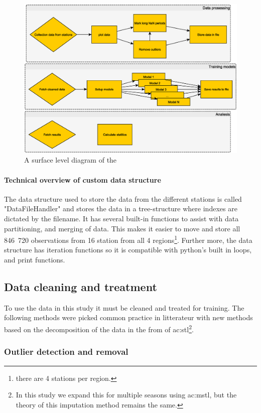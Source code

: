 \begin{figure}
	\centering
	\includegraphics[width=0.7\linewidth]{figures/progress_diagram}
	\caption[Diagram sketching three procedures used in this study.]{A surface level diagram of the }
	\label{fig:progressdiagram}
\end{figure}


\paragraph[Data structure]{Technical overview of custom data structure}
The data structure used to store the data from the different stations is called "DataFileHandler" and stores the data in a tree-structure where indexes are dictated by the filename. It has several built-in functions to assist with data partitioning, and merging of data. This makes it easier to move and store all 846 720 observations from 16 station from all 4 regions\footnote{there are 4 stations per region.}. Further more, the data structure has iteration functions so it is compatible with python's built in loops, and print functions. 

\subsection{Data cleaning and treatment}

To use the data in this study it must be cleaned and treated for training. The following methods were picked common practice in litterateur with new methods based on the decomposition of the data in the from of \acrfull{ac:stl}\cite{cleveland_stl_1990}\footnote{In this study we expand this for multiple seasons using \acrfull{ac:mstl}\cite{bandara_mstl_2021}, but the theory of this imputation method remains the same.}.

\subsubsection{Outlier detection and removal}

